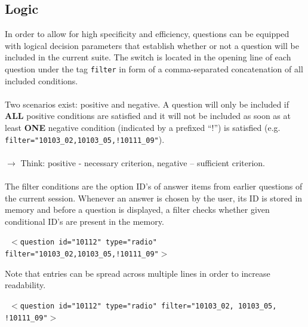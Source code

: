 \documentclass[11pt,a4paper,titlepage]{article}
\begin{document}
\subsection{Logic}\label{sub:logic}

In order to allow for high specificity and efficiency, questions can be equipped with logical decision parameters that establish whether or not a question will be included in the current suite. The switch is located in the opening line of each question under the tag \texttt{filter} in form of a comma-separated concatenation of all included conditions.\\
\\
Two scenarios exist: positive and negative. A question will only be included if \textbf{ALL} positive conditions are satisfied and it will not be included as soon as at least \textbf{ONE} negative condition (indicated by a prefixed ``!'') is satisfied (e.g. \texttt{filter="10103\_02,10103\_05,!10111\_09"}).\\ 
\\
$\rightarrow$ Think: positive - necessary criterion, negative -- sufficient criterion.\\
\\
The filter conditions are the option ID's of answer items from earlier questions of the current session. Whenever an answer is chosen by the user, its ID is stored in memory and before a question is displayed, a filter checks whether given conditional ID's are present in the memory.\\

\begin{center}
	\begin{tcolorbox}[colback=black!10!white,colframe=black!50!white, boxsep=1pt,left=4pt,right=4pt,top=4pt,bottom=2pt]
		\texttt{\noindent
			$<$question id="10112" type="radio" filter="10103\_02,10103\_05,!10111\_09"$>$
		}
	\end{tcolorbox}
\end{center}

Note that entries can be spread across multiple lines in order to increase readability.

\begin{center}
	\begin{tcolorbox}[colback=black!10!white,colframe=black!50!white, boxsep=1pt,left=4pt,right=4pt,top=4pt,bottom=2pt]
		\texttt{\noindent
			$<$question id="10112"\newline
			\hspace*{0.5cm}type="radio" \newline
			\hspace*{0.5cm}filter="10103\_02,\newline
			\hspace*{1.0cm}10103\_05,\newline
			\hspace*{1.0cm}!10111\_09"$>$
		}
	\end{tcolorbox}
\end{center}
\end{document}
